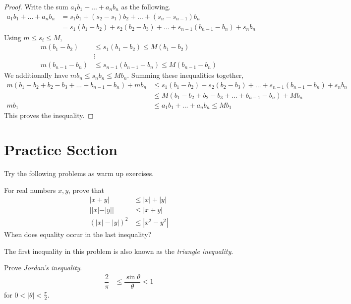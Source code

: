 \documentclass{subfile}
\begin{document}
		\begin{proof}
			Write the sum $a_1b_1+\ldots+a_nb_n$ as the following.
				\begin{align*}
					a_1b_1+\ldots+a_nb_n
						& = s_1b_1+(s_2-s_1)b_2+\ldots+(s_n-s_{n-1})b_n\\
						& = s_1(b_1-b_2)+s_2(b_2-b_3)+\ldots+s_{n-1}(b_{n-1}-b_n)+s_nb_n
				\end{align*}
			Using $m\leq s_i\leq M$,
				\begin{align*}
					m(b_1-b_2)
						& \leq s_1(b_1-b_2) \leq M(b_1-b_2)\\
						& \vdots\\
					m(b_{n-1}-b_{n})
						& \leq s_{n-1}(b_{n-1}-b_n)\leq M(b_{n-1}-b_n)
				\end{align*}
			We additionally have $mb_n\leq s_nb_n\leq Mb_n$. Summing these inequalities together,
				\begin{align*}
					m(b_1-b_2+b_2-b_3+\ldots+b_{n-1}-b_n)+mb_n
						& \leq s_1(b_1-b_2)+s_2(b_2-b_3)+\ldots+s_{n-1}(b_{n-1}-b_n)+s_nb_n\\
						& \leq M(b_1-b_2+b_2-b_3+\ldots+b_{n-1}-b_n)+Mb_n\\
					mb_1
						& \leq a_1b_1+\ldots+a_nb_n\leq Mb_1
				\end{align*}
			This proves the inequality.
		\end{proof}
	\section{Practice Section}
	Try the following problems as warm up exercises.
		\begin{problem}
			For real numbers $x,y$, prove that
				\begin{align*}
					|x+y|
						& \leq|x|+|y|\\
					||x|-|y||
						& \leq|x+y|\\
					(|x|-|y|)^2
						& \leq|x^2-y^2|
				\end{align*}
			When does equality occur in the last inequality?
		\end{problem}
	The first inequality in this problem is also known as the \emph{triangle inequality}.
		\begin{problem}
			Prove \emph{Jordan's inequality}.
				\begin{align*}
					\dfrac{2}{\pi}
						& \leq\dfrac{\sin{\theta}}{\theta}<1
				\end{align*}
			for $0<|\theta|<\frac{\pi}{2}$.
		\end{problem}
	
\end{document}
